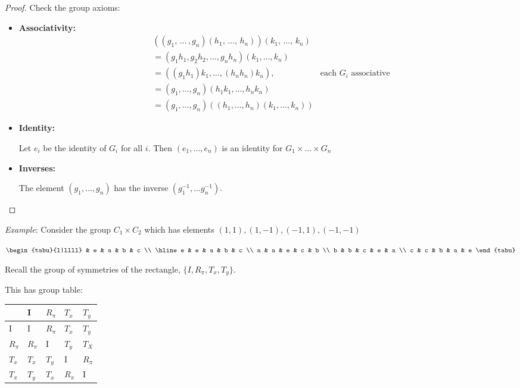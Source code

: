 \documentclass{article}
\theoremstyle{definition}
\begin{document}
\begin{proof}
Check the group axioms:
\begin{itemize}
  \item 
    \textbf{Associativity:}
  \begin{align*}
    & ((g_1, \, \ldots \, , g_n)(h_1,\, \ldots, \, h_n)) (k_1, \, \ldots , \, k_n) & \\
    &= (g_1 h_1, g_2 h_2, \ldots, g_n h_n) (k_1, \ldots , k_n) & \\
    &= ((g_1 h_1)k_1, \ldots , (h_n h_n)k_n), & 
      \text{each } G_i \text{ associative}\\
    &= (g_1, \ldots, g_n) (h_1 k_1, \ldots, h_n k_n) & \\
    &= (g_1, \ldots, g_n) ((h_1, \ldots, h_n) (k_1, \ldots, k_n)) &
  \end{align*}
\item
  \textbf{Identity:}

Let $e_i$ be the identity of $G_i$ for all $i$. Then $(e_1, \ldots, e_n)$ is an identity for $G_1 \times \ldots \times G_n$
\item
  \textbf{Inverses:}

The element $(g_1, \ldots , g_n)$ has the inverse $(g_1^{-1}, \ldots g_n^{-1})$.

\end{itemize}

\end{proof}
\emph{Example}: Consider the group $C_1 \times C_2$ which has elements $(1,1), (1,-1),(-1,1),(-1,-1)$

\begin{table}[h]
\centering
\label{my-label}
$\begin{tabu}{l|llll}
  & e & a & b & c \\ 
  \hline
e & e & a & b & c \\
a & a & e & c & b \\
b & b & c & e & a \\
c & c & b & a & e
\end{tabu}$
\end{table}

Recall the group of symmetries of the rectangle, $\{I, R_\pi, T_x, T_y\}$.

This has group table:

\begin{table}[h]
\centering
\label{my-label}
\begin{tabular}{l|llll}
       & I      & $R_\pi$ & $T_x$   & $T_y$   \\
       \hline
I      & I      & $R_\pi$ & $T_x$   & $T_y$   \\
$R_\pi$ & $R_\pi$ & I      & $T_y$   & $T_X$    \\
$T_x$   & $T_x$   & $T_y$   & I      & $R_\pi$ \\
$T_\pi$ & $T_y$   & $T_x$   & $R_\pi$ & I     
\end{tabular}
\end{table}
\end{document}
